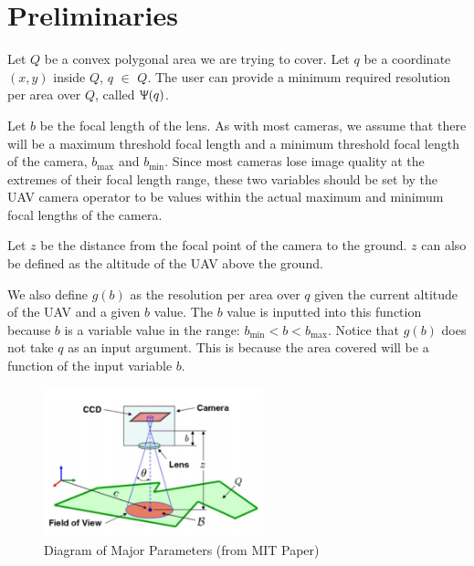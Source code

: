 \documentclass[conference]{IEEEtran}
\theoremstyle{plain}%
\begin{document}

\section{Preliminaries} \label{Preliminaries}
Let $Q$ be a convex polygonal area we are trying to cover. Let $q$ be a coordinate $(x,y)$ inside $Q$, $q$ $\in$ $Q$.
The user can provide a minimum required resolution per area over $Q$, called $\Uppsi(q)$. 

Let $b$ be the focal length of the lens. As with most cameras, we assume that there will be a maximum threshold focal length and a minimum threshold focal length of the camera, $b_\textrm{max}$ and $b_\textrm{min}$. Since most cameras lose image quality at the extremes of their focal length range, these two variables should be set by the UAV camera operator to be values within the actual maximum and minimum focal lengths of the camera.

Let $z$ be the distance from the focal point of the camera to the ground. $z$ can also be defined as the altitude of the UAV above the ground. 

We also define $g(b)$ as the resolution per area over $q$ given the current altitude of the UAV and a given $b$ value. The $b$ value is inputted into this function because $b$ is a variable value in the range: $b_\textrm{min}<b<b_\textrm{max}$. Notice that $g(b)$ does not take $q$ as an input argument. This is because the area covered will be a function of the input variable $b$.

\begin{figure}[!t]
\centering
\includegraphics[width=2.5in]{MIT_pic}
\caption{Diagram of Major Parameters (from MIT Paper)}
\label{major_params}
\end{figure}

\end{document}
